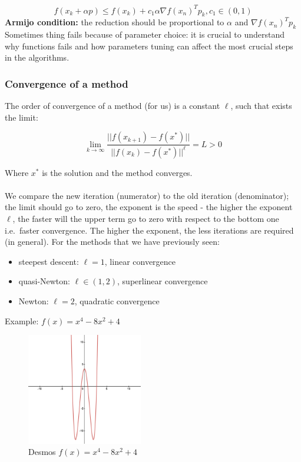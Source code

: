 $$
f(x_k+\alpha p) \leq f(x_k) + c_1\alpha \nabla f(x_n)^T p_k, c_1 \in (0,1)
$$
\noindent
\textbf{Armijo condition:} the reduction should be proportional to
$\alpha$ and $\nabla f(x_n)^T p_k$
\noindent
Sometimes thing fails because of parameter choice: it is crucial to
understand why functions fails and how parameters tuning can affect the
most crucial steps in the algorithms.


\subsubsection{Convergence of a method}

The order of convergence of a method (for us) is a constant $\ell$, such
that exists the limit:

$$
\lim_{k \rightarrow \infty  }\frac{||f(x_{k+1})-f(x^*)||}{||f(x_{k})-f(x^*)||^\ell} = L >0
$$

Where $x^*$ is the solution and the method converges.
\\
\\
\noindent
We compare the new iteration (numerator) to the old iteration
(denominator); the limit should go to zero, the exponent is the speed -
the higher the exponent $\ell$, the faster will the upper term go to
zero with respect to the bottom one i.e.~faster convergence. The higher
the exponent, the less iterations are required (in general). For the
methods that we have previously seen:

\begin{itemize}
\tightlist
\item
  steepest descent: $\ell=1$, linear convergence
\item
  quasi-Newton: $\ell \in (1,2)$, superlinear convergence
\item
  Newton: $\ell=2$, quadratic convergence
\end{itemize}

Example: $f(x)=x^4-8x^2+4$

\begin{figure}
\centering
\includegraphics[width=0.45\textwidth]{function.png}
\caption{Desmos  $f(x)=x^4-8x^2+4$}
\end{figure}


